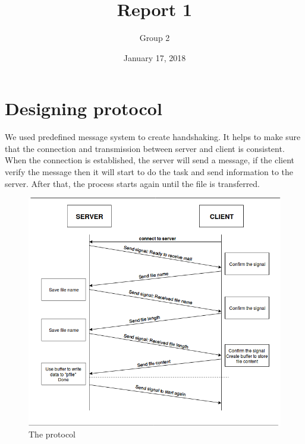 \documentclass[12pt]{article}
\title{Report 1}
\author{Group 2}
\date{January 17, 2018}
\begin{document}
\maketitle
  \section{Designing protocol}
    We used predefined message system to create handshaking. It helps to make sure that the connection and transmission between server and client is consistent. When the connection is established, the server will send a message, if the client verify the message then it will start to do the task and send information to the server. After that, the process starts again until the file is transferred.
    \begin{figure}[h]
        \centering
       \includegraphics[scale=0.4]{protocol.png}
       \caption{The protocol}
    \end{figure}
  
\end{document}
